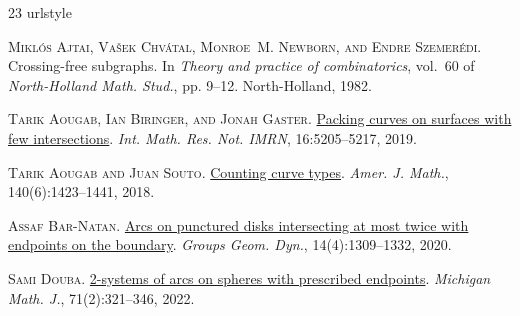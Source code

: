 \documentclass[a4paper,11pt]{article}
\begin{document}
\fontsize{11pt}{12pt}
\selectfont
\def\soft#1{\leavevmode\setbox0=\hbox{h}\dimen7=\ht0\advance \dimen7 by-1ex\relax\if t#1\relax\rlap{\raise.6\dimen7 \hbox{\kern.3ex\char'47}}#1\relax\else\if T#1\relax \rlap{\raise.5\dimen7\hbox{\kern1.3ex\char'47}}#1\relax \else\if d#1\relax\rlap{\raise.5\dimen7\hbox{\kern.9ex \char'47}}#1\relax\else\if D#1\relax\rlap{\raise.5\dimen7 \hbox{\kern1.4ex\char'47}}#1\relax\else\if l#1\relax \rlap{\raise.5\dimen7\hbox{\kern.4ex\char'47}}#1\relax \else\if L#1\relax\rlap{\raise.5\dimen7\hbox{\kern.7ex \char'47}}#1\relax\else\message{accent \string\soft \space #1 not defined!}#1\relax\fi\fi\fi\fi\fi\fi}
\begin{thebibliography}{23}
	\providecommand{\natexlab}[1]{#1}
	\providecommand{\msn}[1]{MR:\,\href{http://www.ams.org/mathscinet-getitem?mr=MR{#1}}{#1}}
	\providecommand{\ZBL}[1]{Zbl:\,\href{https://www.zentralblatt-math.org/zmath/en/search/?q=an:#1}{#1}}
	\providecommand{\url}[1]{\texttt{#1}}
	\providecommand{\urlprefix}{}
	\expandafter\ifx\csname urlstyle\endcsname\relax
	\providecommand{\doi}[1]{doi:\discretionary{}{}{}#1}\else
	\providecommand{\doi}{doi:\discretionary{}{}{}\begingroup \urlstyle{rm}\Url}\fi
	
	\textsc{Mikl{\'o}s Ajtai, Va{\v{s}}ek Chv{\'a}tal, Monroe~M. Newborn, and Endre Szemer{\'e}di}.
	\newblock Crossing-free subgraphs.
	\newblock In \emph{Theory and practice of combinatorics}, vol.~60 of \emph{North-Holland Math. Stud.}, pp. 9--12. North-Holland, 1982.
	
	\textsc{Tarik Aougab, Ian Biringer, and Jonah Gaster}.
	\newblock \href{https://doi.org/10.1093/imrn/rnx270}{Packing curves on surfaces with few intersections}.
	\newblock \emph{Int. Math. Res. Not. IMRN}, 16:5205--5217, 2019.
	
	\textsc{Tarik Aougab and Juan Souto}.
	\newblock \href{https://doi.org/10.1353/ajm.2018.0043}{Counting curve types}.
	\newblock \emph{Amer. J. Math.}, 140(6):1423--1441, 2018.
	
	\textsc{Assaf Bar-Natan}.
	\newblock \href{https://doi.org/10.4171/ggd/582}{Arcs on punctured disks intersecting at most twice with endpoints on the boundary}.
	\newblock \emph{Groups Geom. Dyn.}, 14(4):1309--1332, 2020.
	
	\textsc{Sami Douba}.
	\newblock \href{https://doi.org/10.1307/mmj/20195794}{2-systems of arcs on spheres with prescribed endpoints}.
	\newblock \emph{Michigan Math. J.}, 71(2):321--346, 2022.
	

\end{thebibliography}
\end{document}
